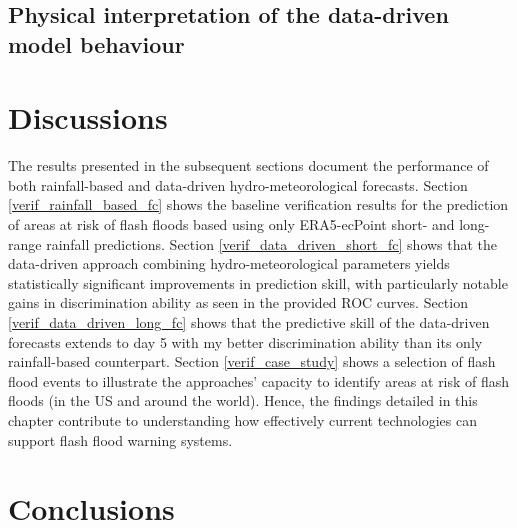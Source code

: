 \subsection{Physical interpretation of the data-driven model behaviour}



\section{Discussions}

The results presented in the subsequent sections document the performance of both rainfall-based and data-driven hydro-meteorological forecasts. Section \ref{verif_rainfall_based_fc} shows the baseline verification results for the prediction of areas at risk of flash floods based using only ERA5-ecPoint short- and long-range rainfall predictions. Section \ref{verif_data_driven_short_fc} shows that the data-driven approach combining hydro-meteorological parameters yields statistically significant improvements in prediction skill, with particularly notable gains in discrimination ability as seen in the provided ROC curves. Section \ref{verif_data_driven_long_fc} shows that the predictive skill of the data-driven forecasts extends to day 5 with my better discrimination ability than its only rainfall-based counterpart. Section \ref{verif_case_study} shows a selection of flash flood events to illustrate the approaches' capacity to identify areas at risk of flash floods (in the US and around the world). Hence, the findings detailed in this chapter contribute to understanding how effectively current technologies can support flash flood warning systems.



\section{Conclusions}

